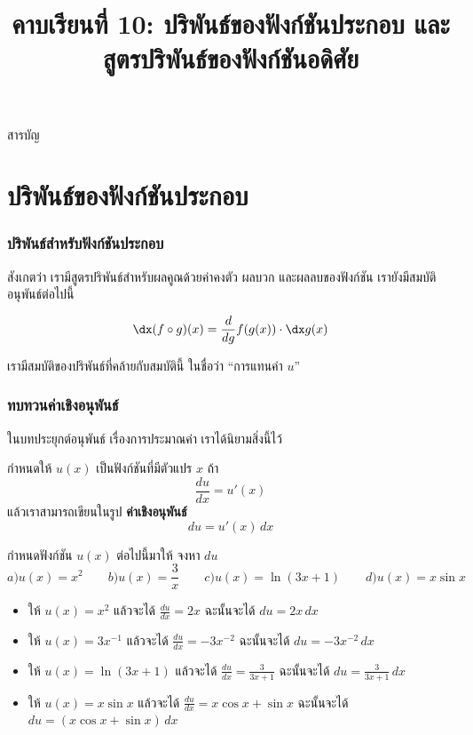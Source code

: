 \title{คาบเรียนที่ 10: ปริพันธ์ของฟังก์ชันประกอบ และสูตรปริพันธ์ของฟังก์ชันอดิศัย}
\frame{\titlepage}

\begin{frame}{สารบัญ}
\tableofcontents
\end{frame}

\section{ปริพันธ์ของฟังก์ชันประกอบ}
\frame{\sectionpage}

\begin{frame}
\frametitle{ปริพันธ์สำหรับฟังก์ชันประกอบ}
สังเกตว่า เรามีสูตรปริพันธ์สำหรับผลคูณด้วยค่าคงตัว ผลบวก และผลลบของฟังก์ชัน เรายังมีสมบัติอนุพันธ์ต่อไปนี้
\begin{thm}{}{}
\[\dx (f \circ g)(x) = \frac{d}{dg} f(g(x)) \cdot \dx g(x)\]
\end{thm}
เรามีสมบัติของปริพันธ์ที่คล้ายกับสมบัตินี้ ในชื่อว่า ``การแทนค่า $u$''
\end{frame}

\begin{frame}
\frametitle{ทบทวนค่าเชิงอนุพันธ์}
ในบทประยุกต์อนุพันธ์ เรื่องการประมาณค่า เราได้นิยามสิ่งนี้ไว้
\begin{thm}{}{}
กำหนดให้ $u(x)$ เป็นฟังก์ชันที่มีตัวแปร $x$ \pa ถ้า 
\[\frac{du}{dx} = u'(x)\] \pa 
แล้วเราสามารถเขียนในรูป \textbf{ค่าเชิงอนุพันธ์}
\[ du = u'(x) \, dx\]
\end{thm}
\end{frame}


\begin{frame}[t]
\begin{ex}
กำหนดฟังก์ชัน $u(x)$ ต่อไปนี้มาให้ จงหา $du$
\[a) u(x) = x^2 \qquad b) u(x) = \frac{3}{x} \qquad c) u(x) = \ln (3x+1) \qquad d) u(x) = x \sin x\]
\end{ex}
\begin{sol}
\begin{itemize}
\item ให้ $u(x) = x^2$ \pa แล้วจะได้ $ \frac{du}{dx} = 2x$ \pa ฉะนั้นจะได้ $du = 2x \, dx$ \pa
\item ให้ $u(x) = 3x^{-1}$ \pa แล้วจะได้ $  \frac{du}{dx} = -3x^{-2}$ \pa ฉะนั้นจะได้ $du = -3x^{-2} \, dx$ \pa
\item ให้ $u(x) = \ln (3x+1) $ \pa แล้วจะได้ $  \frac{du}{dx} = \frac{3}{3x+1}$ \pa ฉะนั้นจะได้ $du = \frac{3}{3x+1} \, dx$ \pa
\item ให้ $u(x) = x\sin x$ \pa แล้วจะได้ $ \frac{du}{dx} = x \cos x + \sin x$ \pa ฉะนั้นจะได้ $du = (x \cos x + \sin x) \, dx$
\end{itemize}
\end{sol}
\end{frame}

